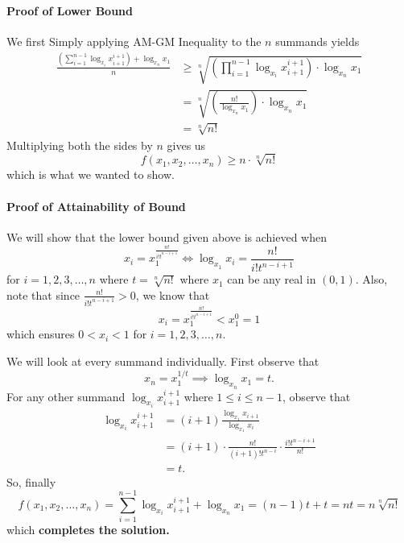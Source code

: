 \documentclass[numbers=endperiod, 11pt]{scrartcl}
\begin{document}
\begin{sol}
    \paragraph{Proof of Lower Bound} We first Simply applying
    AM-GM Inequality to the $n$ summands yields
    \begin{align*}
        \frac{\left(\sum_{i = 1}^{n-1}\log_{x_i} x_{i+1}^{i+1}\right) + \log_{x_n}x_1}{n} & \ge \sqrt[n]{\left( \prod_{i = 1}^{n-1} \log_{x_i}x_{i+1}^{i+1} \right) \cdot \log_{x_n}x_1} \\
                                                                                          & = \sqrt[n]{\left( \frac{n!}{\log_{x_n} x_1} \right) \cdot \log_{x_n} x_1}                    \\
                                                                                          & = \sqrt[n]{n!}
    \end{align*}
    Multiplying both the sides by $n$ gives us
    \[ f(x_1,x_2,\dots, x_n) \ge n\cdot{\sqrt[n]{n!}}\]
    which is what we wanted to show.

    \paragraph{Proof of Attainability of Bound}
    We will show that the lower bound given above is
    achieved when
    \[ x_i = x_1^{\frac{n!}{i!t^{n-i+1}}} \iff \log_{x_1}x_i = \frac{n!}{i! t^{n-i+1}}\]
    for $i = 1,2,3,\dots,n$ where $t = \sqrt[n]{n!}$ where
    $x_1$ can be any real in $(0,1)$. Also, note that
    since $\frac{n!}{i! t^{n-i+1}} > 0$, we know that
    \[x_i = x_1^{\frac{n!}{i! t^{n-i+1}}} < x_1 ^ 0 = 1 \]
    which ensures $0 < x_i < 1$ for $i = 1,2,3,\dots, n$.

    We will look at every summand individually. First
    observe that
    \[ x_n = x_1^{1/t} \implies \log_{x_n}x_1 = t.\]
    For any other summand $\log_{x_i} x_{i+1}^{i+1}$
    where $1 \le i \le n-1$, observe that
    \begin{align*}
        \log_{x_i} x_{i+1}^{i+1} & = (i+1)\frac{\log_{x_1} x_{i+1}}{\log_{x_1}x_i}                     \\
                                 & = (i+1) \cdot \frac{n!}{(i+1)!t^{n-i}} \cdot \frac{i!t^{n-i+1}}{n!} \\
                                 & = t.
    \end{align*}
    So, finally
    \[ f(x_1,x_2, \dots, x_n) = \sum_{i = 1}^{n-1}\log_{x_i} x_{i+1}^{i+1} + \log_{x_n} x_1 = (n-1)t + t = nt = n\sqrt[n]{n!} \]
    which \textbf{completes the solution.}
\end{sol}
\newpage
\end{document}
